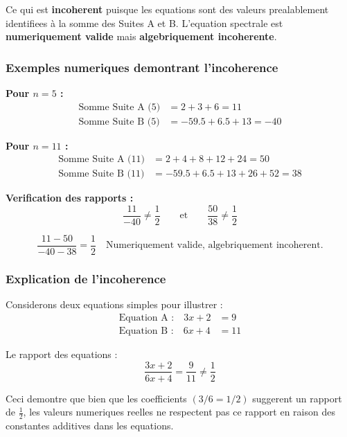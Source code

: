 \documentclass[a4paper,11pt]{article}
\begin{document}
\begin{tcolorbox}[colback=red!5,colframe=red!75,title={\textbf{Attention : Incoherence algebrique}}]
Ce qui est \textbf{incoherent} puisque les equations sont des valeurs prealablement identifiees à la somme des Suites A et B. L'equation spectrale est \textbf{numeriquement valide} mais \textbf{algebriquement incoherente}.
\end{tcolorbox}

\subsubsection{Exemples numeriques demontrant l'incoherence}

\textbf{Pour $n = 5$ :}
\begin{align}
\text{Somme Suite A (5)} &= 2 + 3 + 6 = 11 \\
\text{Somme Suite B (5)} &= -59.5 + 6.5 + 13 = -40
\end{align}

\textbf{Pour $n = 11$ :}
\begin{align}
\text{Somme Suite A (11)} &= 2 + 4 + 8 + 12 + 24 = 50 \\
\text{Somme Suite B (11)} &= -59.5 + 6.5 + 13 + 26 + 52 = 38
\end{align}

\textbf{Verification des rapports :}
\[
\frac{11}{-40} \neq \frac{1}{2}
\qquad\text{et}\qquad
\frac{50}{38} \neq \frac{1}{2}
\]

\[
\frac{11 - 50}{-40 - 38} = \frac{1}{2}
\quad\text{Numeriquement valide, algebriquement incoherent.}
\]

\subsubsection{Explication de l'incoherence}

Considerons deux equations simples pour illustrer :
\begin{align}
\text{Equation A :} \quad 3x + 2 &= 9 \\
\text{Equation B :} \quad 6x + 4 &= 11
\end{align}

Le rapport des equations :
\[
\frac{3x + 2}{6x + 4} = \frac{9}{11} \neq \frac{1}{2}
\]

Ceci demontre que bien que les coefficients $(3/6 = 1/2)$ suggerent un rapport de $\frac{1}{2}$, les valeurs numeriques reelles ne respectent pas ce rapport en raison des constantes additives dans les equations.
\end{document}
